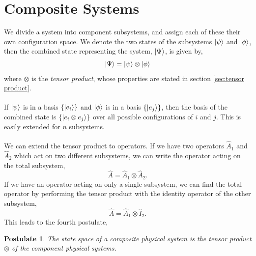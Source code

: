 \documentclass{book}
\newtheorem{postulate}{\textbf{Postulate}}
\begin{document}
\section{Composite Systems}
We divide a system into component subsystems, and assign each of these their own configuration space. We denote the two states of the subsystems $\ket{\psi}$ and $\ket{\phi}$, then the combined state representing the system, $\ket{\Psi}$, is given by,
\begin{equation}
	\ket{\Psi}=\ket{\psi}\otimes\ket{\phi}
\end{equation}
where $\otimes$ is the \textit{tensor product}, whose properties are stated in section \ref{sec:tensor product}. 
\\\\
If $\ket{\psi}$ is in a basis $\left\{\ket{e_i}\right\}$ and $\ket{\phi}$ is in a basis $\left\{\ket{e_j}\right\}$, then the basis of the combined state is $\left\{\ket{e_i\otimes e_j}\right\}$ over all possible configurations of $i$ and $j$. This is easily extended for $n$ subsystems.
\\\\
We can extend the tensor product to operators. If we have two operators $\hat{A}_1$ and $\hat{A}_2$ which act on two different subsystems, we can write the operator acting on the total subsystem,
\begin{equation}
	\hat{A} = \hat{A}_1 \otimes \hat{A}_2.
\end{equation}
If we have an operator acting on only a single subsystem, we can find the total operator by performing the tensor product with the identity operator of the other subsystem,
\begin{equation}
	\hat{A} = \hat{A}_1 \otimes \hat{I}_2.
\end{equation}
This leads to the fourth postulate,
\begin{postulate}
	The state space of a composite physical system is the tensor product $\otimes$ of the component physical systems.
\end{postulate}
\end{document}
